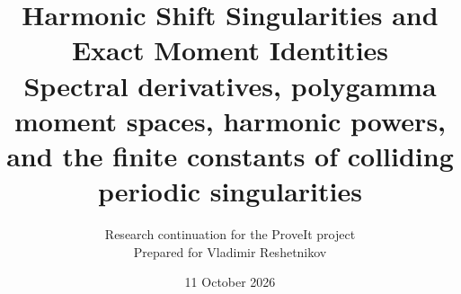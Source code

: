 
\title{\textbf{Harmonic Shift Singularities and Exact Moment Identities}\\[5pt]
\large Spectral derivatives, polygamma moment spaces, harmonic powers,\\
and the finite constants of colliding periodic singularities}
\author{Research continuation for the ProveIt project\\
\small Prepared for Vladimir Reshetnikov}
\date{11 October 2026}

\maketitle

\clearpage
\begingroup
\small
\setlength{\parskip}{0pt}
\tableofcontents
\endgroup
\clearpage









